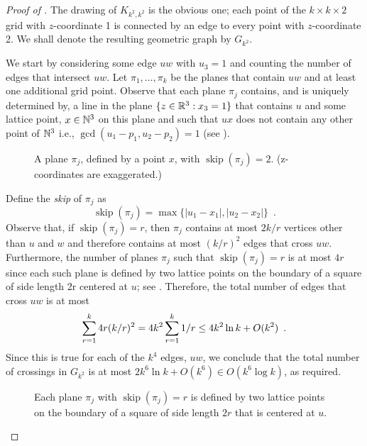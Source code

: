 \documentclass{patmorin}
\DeclareMathOperator{\skp}{skip}
\begin{document}
\begin{proof}[Proof of ]
  The drawing of $K_{k^2,k^2}$ is the obvious one; each point of the
  $k\times k\times2$ grid with $z$-coordinate 1 is connected by an edge
  to every point with $z$-coordinate 2.  We shall denote the resulting
  geometric graph by $G_{k^2}$.
  
  We start by considering some edge $uw$ with $u_3=1$ and counting the
  number of edges that intersect $uw$.  Let $\pi_1,\ldots,\pi_k$ be
  the planes that contain $uw$ and at least one additional grid point.
  Observe that each plane $\pi_j$ contains, and is uniquely determined
  by, a line in the plane $\{z\in\mathbb{R}^3: x_3=1\}$ that contains $u$ and
  some lattice point, $x\in\mathbb{N}^3$ on this plane and such that $ux$ does
  not contain any other point of $\mathbb{N}^3$ i.e., $\gcd(u_1-p_1,u_2-p_2)=1$
  (see ).
  \begin{figure}
    \caption{A plane $\pi_j$, defined by a point $x$, with
      $\skp(\pi_j)=2$. (z-coordinates are exaggerated.)}
  \end{figure}
  Define the \emph{skip} of $\pi_j$ as
  \[
     \skp(\pi_j)=\max\{|u_1-x_1|,|u_2-x_2|\} \enspace .
  \]
  Observe that, if $\skp(\pi_j)=r$, then $\pi_j$ contains at most $2k/r$
  vertices other than $u$ and $w$ and therefore contains at most $(k/r)^2$
  edges that cross $uw$.  Furthermore, the number of planes $\pi_j$
  such that $\skp(\pi_j)=r$ is at most $4r$ since each such plane is
  defined by two lattice points on the boundary of a square of side
  length 2r centered at $u$; see .   Therefore,
  the total number of edges that cross $uw$ is at most
  \begin{equation}
     \sum_{r=1}^k 4r(k/r)^2 = 4k^2\sum_{r=1}^k 1/r 
       \le 4k^2\ln k + O(k^2) \enspace .
        \eqlabel{critical}
  \end{equation}
  Since this is true for each of the $k^4$ edges, $uw$, we conclude
  that the total number of crossings in $G_{k^2}$ is at most $2k^6\ln
  k+O(k^6)\in O(k^6\log k)$, as required.
  \begin{figure}
    \caption{Each plane $\pi_j$ with $\skp(\pi_j)=r$ is defined by two 
      lattice points on the boundary of a square of side length $2r$ that
      is centered at $u$.}
  \end{figure}
\end{proof}
\end{document}
